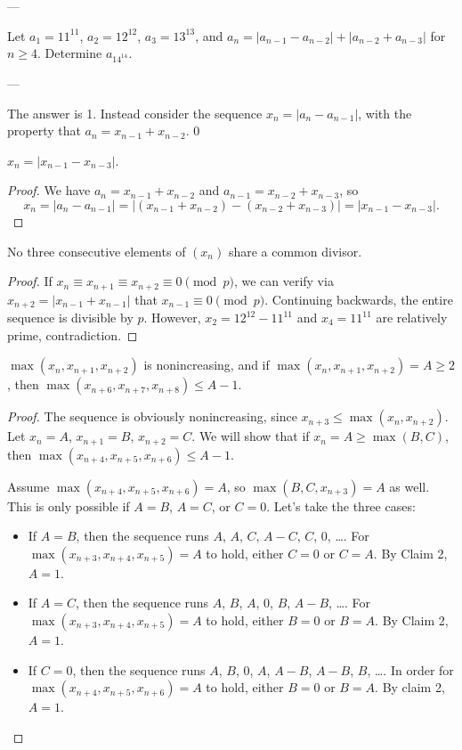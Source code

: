 
---

Let $a_1=11^{11}$, $a_2=12^{12}$, $a_3=13^{13}$, and $a_n=|a_{n-1}-a_{n-2}|+|a_{n-2}+a_{n-3}|$ for $n\ge4$. Determine $a_{14^{14}}$.

---

The answer is 1. Instead consider the sequence $x_n=|a_n-a_{n-1}|$, with the property that $a_n=x_{n-1}+x_{n-2}$.
\setcounter{claim}0
\begin{claim}
    $x_n=|x_{n-1}-x_{n-3}|$.
\end{claim}
\begin{proof}
    We have $a_n=x_{n-1}+x_{n-2}$ and $a_{n-1}=x_{n-2}+x_{n-3}$, so
    \[x_n=|a_n-a_{n-1}|=\big\lvert(x_{n-1}+x_{n-2})-(x_{n-2}+x_{n-3})\big\rvert=|x_{n-1}-x_{n-3}|.\]
\end{proof}
\begin{claim}
    No three consecutive elements of $(x_n)$ share a common divisor.
\end{claim}
\begin{proof}
    If $x_n\equiv x_{n+1}\equiv x_{n+2}\equiv0\pmod p$, we can verify via $x_{n+2}=|x_{n-1}+x_{n-1}|$ that $x_{n-1}\equiv0\pmod p$. Continuing backwards, the entire sequence is divisible by $p$. However, $x_2=12^{12}-11^{11}$ and $x_4=11^{11}$ are relatively prime, contradiction.
\end{proof}
\begin{claim}
    $\max(x_n,x_{n+1},x_{n+2})$ is nonincreasing, and if $\max(x_n,x_{n+1},x_{n+2})=A\ge2$, then $\max(x_{n+6},x_{n+7},x_{n+8})\le A-1$.
\end{claim}
\begin{proof}
    The sequence is obviously nonincreasing, since $x_{n+3}\le\max(x_n,x_{n+2})$. Let $x_n=A$, $x_{n+1}=B$, $x_{n+2}=C$. We will show that if $x_n=A\ge\max(B,C)$, then $\max(x_{n+4},x_{n+5},x_{n+6})\le A-1$.

    Assume $\max(x_{n+4},x_{n+5},x_{n+6})=A$, so $\max(B,C,x_{n+3})=A$ as well. This is only possible if $A=B$, $A=C$, or $C=0$. Let's take the three cases:
    \begin{itemize}
        \item If $A=B$, then the sequence runs $A$, $A$, $C$, $A-C$, $C$, 0, \ldots. For $\max(x_{n+3},x_{n+4},x_{n+5})=A$ to hold, either $C=0$ or $C=A$. By Claim 2, $A=1$.
        \item If $A=C$, then the sequence runs $A$, $B$, $A$, 0, $B$, $A-B$, \ldots. For $\max(x_{n+3},x_{n+4},x_{n+5})=A$ to hold, either $B=0$ or $B=A$. By Claim 2, $A=1$.
        \item If $C=0$, then the sequence runs $A$, $B$, 0, $A$, $A-B$, $A-B$, $B$, \ldots. In order for $\max(x_{n+4},x_{n+5},x_{n+6})=A$ to hold,  either $B=0$ or $B=A$. By claim 2, $A=1$.
    \end{itemize}
\end{proof}

